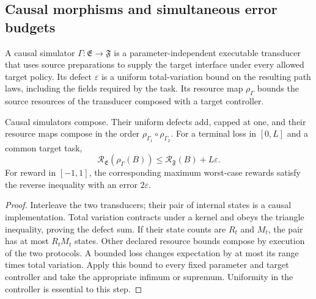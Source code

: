 \subsection{Causal morphisms and simultaneous error budgets}
A causal simulator $\Gamma:\mathfrak E\to\mathfrak F$ is a
parameter-independent executable transducer that uses source
preparations to supply the target interface under every allowed target
policy. Its defect $\varepsilon$ is a uniform total-variation bound on
the resulting path laws, including the fields required by the task.
Its resource map $\rho_\Gamma$ bounds the source resources of the
transducer composed with a target controller.

\begin{proposition}\label{prop:causal-morphism}
Causal simulators compose. Their uniform defects add, capped at one,
and their resource maps compose in the order
$\rho_{\Gamma_1}\circ\rho_{\Gamma_2}$. For a terminal loss in $[0,L]$
and a common target task,
\[
 \mathcal R_{\mathfrak E}(\rho_\Gamma(B))
           \le\mathcal R_{\mathfrak F}(B)+L\varepsilon.
\]
For reward in $[-1,1]$, the corresponding maximum worst-case rewards
satisfy the reverse inequality with an error $2\varepsilon$.
\end{proposition}
\begin{proof}
Interleave the two transducers; their pair of internal states is a causal
implementation. Total variation contracts under a kernel and obeys the
triangle inequality, proving the defect sum. If their state counts are
$R_t$ and $M_t$, the pair has at most $R_tM_t$ states. Other declared
resource bounds compose by execution of the two protocols. A bounded
loss changes expectation by at most its range times total variation.
Apply this bound to every fixed parameter and target controller and
take the appropriate infimum or supremum. Uniformity in the controller
is essential to this step.
\end{proof}

